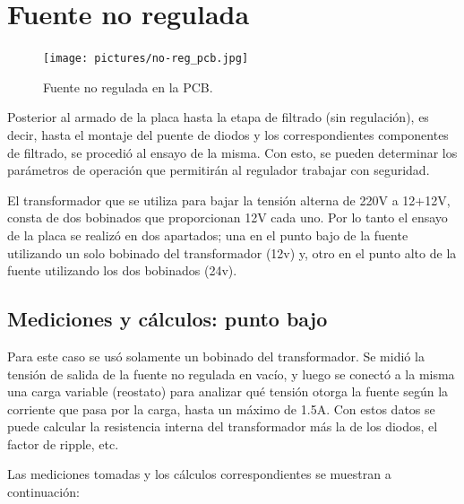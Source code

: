 \documentclass[chaptersright]{informeutn}
\begin{document}
    \section{Fuente no regulada}
      \begin{figure}
        \centering
        \texttt{[image: pictures/no-reg\_pcb.jpg]}
        \caption{Fuente no regulada en la PCB.}
      \end{figure}
      Posterior al armado de la placa hasta la etapa de filtrado (sin regulación), es decir, hasta el montaje del
      puente de diodos y los correspondientes componentes de filtrado, se procedió al ensayo de la misma. Con esto,
      se pueden determinar los parámetros de operación que permitirán al regulador trabajar con seguridad.

      El transformador que se utiliza para bajar la tensión alterna de 220V a 12+12V, consta de dos bobinados que
      proporcionan 12V cada uno. Por lo tanto el ensayo de la placa se realizó en dos apartados; una en el punto bajo
      de la fuente utilizando un solo bobinado del transformador (12v) y, otro en el punto alto de la fuente utilizando
      los dos bobinados (24v).

      \subsection{Mediciones y cálculos: punto bajo}
        Para este caso se usó solamente un bobinado del transformador. Se midió la tensión de salida de la fuente no
        regulada en vacío, y luego se conectó a la misma una carga variable (reostato) para analizar qué tensión
        otorga la fuente según la corriente que pasa por la carga, hasta un máximo de 1.5A. Con estos datos se puede
        calcular la resistencia interna del transformador más la de los diodos, el factor de ripple, etc.

        Las mediciones tomadas y los cálculos correspondientes se muestran a continuación:
\end{document}
